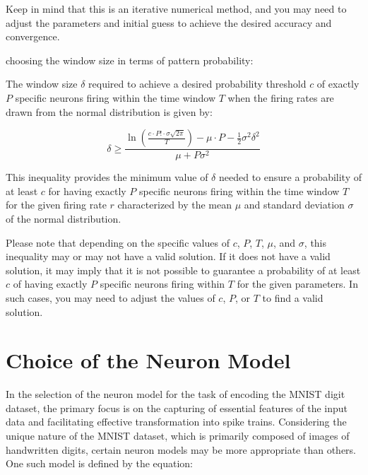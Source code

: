 Keep in mind that this is an iterative numerical method, and you may need to adjust the parameters and initial guess to achieve the desired accuracy and convergence.


choosing the window size in terms of pattern probability:

The window size \(\delta\) required to achieve a desired probability threshold \(c\) of exactly \(P\) specific neurons firing within the time window \(T\) when the firing rates are drawn from the normal distribution is given by:

\begin{equation}
\delta \geq \frac{{\ln\left(\frac{{c \cdot P! \cdot \sigma \sqrt{2\pi}}}{{T}}\right) - \mu \cdot P - \frac{1}{2}\sigma^2 \delta^2}}{{\mu + P\sigma^2}}
\end{equation}

This inequality provides the minimum value of \(\delta\) needed to ensure a probability of at least \(c\) for having exactly \(P\) specific neurons firing within the time window \(T\) for the given firing rate \(r\) characterized by the mean \(\mu\) and standard deviation \(\sigma\) of the normal distribution.

Please note that depending on the specific values of \(c\), \(P\), \(T\), \(\mu\), and \(\sigma\), this inequality may or may not have a valid solution. If it does not have a valid solution, it may imply that it is not possible to guarantee a probability of at least \(c\) of having exactly \(P\) specific neurons firing within \(T\) for the given parameters. In such cases, you may need to adjust the values of \(c\), \(P\), or \(T\) to find a valid solution.



\section{Choice of the Neuron Model}
In the selection of the neuron model for the task of encoding the MNIST digit dataset, the primary focus is on the capturing of essential features of the input data and facilitating effective transformation into spike trains. Considering the unique nature of the MNIST dataset, which is primarily composed of images of handwritten digits, certain neuron models may be more appropriate than others. One such model is defined by the equation:

